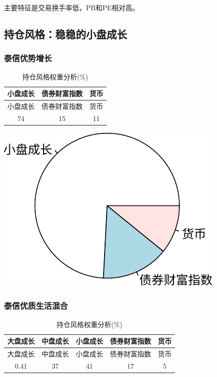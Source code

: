 \documentclass[hyperref,]{ctexart}
\begin{document}
主要特征是交易换手率低，PB和PE相对高。

\subsection{持仓风格：稳稳的小盘成长}

\subsubsection{泰信优势增长}

\begin{longtable}[]{@{}ccc@{}}
\caption{持仓风格权重分析(\%)}\tabularnewline
\toprule
小盘成长 & 债券财富指数 & 货币\tabularnewline
\midrule
\endfirsthead
\toprule
小盘成长 & 债券财富指数 & 货币\tabularnewline
\midrule
\endhead
74 & 15 & 11\tabularnewline
\bottomrule
\end{longtable}

\includegraphics{zzq-detail_files/figure-latex/unnamed-chunk-12-1.pdf}

\subsubsection{泰信优质生活混合}\label{-1}

\begin{longtable}[]{@{}ccccc@{}}
\caption{持仓风格权重分析(\%)}\tabularnewline
\toprule
大盘成长 & 中盘成长 & 小盘成长 & 债券财富指数 & 货币\tabularnewline
\midrule
\endfirsthead
\toprule
大盘成长 & 中盘成长 & 小盘成长 & 债券财富指数 & 货币\tabularnewline
\midrule
\endhead
0.41 & 37 & 41 & 17 & 5\tabularnewline
\bottomrule
\end{longtable}
\end{document}
